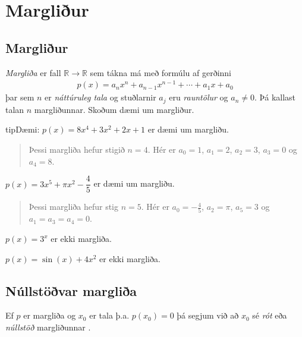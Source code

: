 \documentclass[a4paper,10pt,icelandic]{sphinxmanual}
\begin{document}
\chapter{Margliður}
\label{\detokenize{Kafli06:margliur}}\label{\detokenize{Kafli06::doc}}

\section{Margliður}
\label{\detokenize{Kafli06:id1}}
\textit{Margliða} er fall \(\mathbb{R} \to \mathbb{R}\) sem tákna má með formúlu af gerðinni
\begin{equation*}
\begin{split}p(x)=a_nx^n+a_{n-1}x^{n-1}+ \cdots + a_1x+a_0\end{split}
\end{equation*}
þar sem \(n\) er \textit{náttúruleg tala} og stuðlarnir \(a_j\) eru \textit{rauntölur} og \(a_n \neq 0\). Þá kallast talan \(n\)  margliðunnar. Skoðum dæmi um margliður.

\begin{sphinxadmonition}{tip}{Dæmi:}
 \(p(x)=8x^4+3x^2+2x+1\) er dæmi um margliðu.
\begin{quote}

Þessi margliða hefur stigið \(n=4\). Hér er \(a_0=1\), \(a_1=2\), \(a_2=3\), \(a_3=0\) og \(a_4=8\).
\end{quote}

 \(p(x)=3x^5+\pi x^2-\dfrac{4}{5}\) er dæmi um margliðu.
\begin{quote}

Þessi margliða hefur stig \(n=5\). Hér er \(a_0=-\frac{4}{5}\), \(a_2=\pi\), \(a_5=3\) og \(a_1=a_3=a_4=0\).
\end{quote}

 \(p(x)=3^x\) er ekki margliða.

 \(p(x)=\sin(x)+4x^2\) er ekki margliða.
\end{sphinxadmonition}


\section{Núllstöðvar margliða}
\label{\detokenize{Kafli06:nullstovar-marglia}}
Ef \(p\) er margliða og \(x_0\) er tala þ.a. \(p(x_0)=0\) þá segjum við að \(x_0\) sé \textit{rót} eða \textit{núllstöð} margliðunnar .
\end{document}
